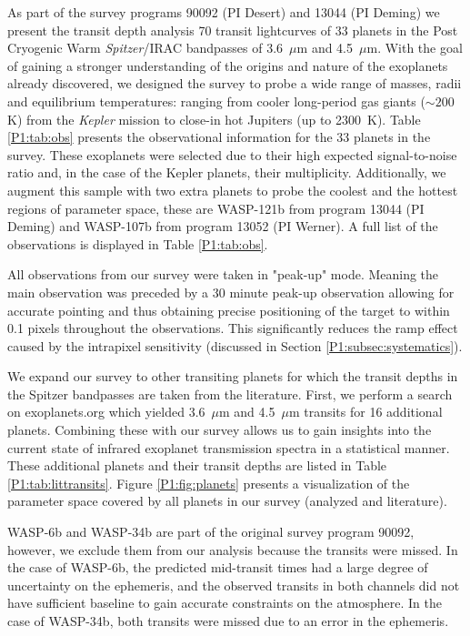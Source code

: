 As part of the survey programs 90092 (PI Desert) and 13044 (PI Deming) we present the transit depth analysis 70 transit lightcurves of 33 planets in the Post Cryogenic Warm \textit{Spitzer}/IRAC bandpasses of 3.6~$\mu$m and 4.5~$\mu$m. With the goal of gaining a stronger understanding of the origins and nature of the exoplanets already discovered, we designed the survey to probe a wide range of masses, radii and equilibrium temperatures: ranging from cooler long-period gas giants ($\sim200$K) from the \textit{Kepler} mission to close-in hot Jupiters (up to 2300~K). Table \ref{P1:tab:obs} presents the observational information for the 33 planets in the survey. These exoplanets were selected due to their high expected signal-to-noise ratio and, in the case of the Kepler planets, their multiplicity. Additionally, we augment this sample with two extra planets to probe the coolest and the hottest regions of parameter space, these are WASP-121b from program 13044 (PI Deming) and WASP-107b from program 13052 (PI Werner). A full list of the observations is displayed in Table \ref{P1:tab:obs}.

All observations from our survey were taken in "peak-up" mode. Meaning the main observation was preceded by a 30 minute peak-up observation allowing for accurate pointing and thus obtaining precise positioning of the target to within 0.1 pixels throughout the observations. This significantly reduces the ramp effect caused by the intrapixel sensitivity (discussed in Section \ref{P1:subsec:systematics}).

We expand our survey to other transiting planets for which the transit depths in the Spitzer bandpasses are taken from the literature. First, we perform a search on exoplanets.org \citep{Wright2011} which yielded 3.6~$\mu$m and 4.5~$\mu$m transits for 16 additional planets. Combining these with our survey allows us to gain insights into the current state of infrared exoplanet transmission spectra in a statistical manner. These additional planets and their transit depths are listed in Table \ref{P1:tab:littransits}. Figure \ref{P1:fig:planets} presents a visualization of the parameter space covered by all planets in our survey (analyzed and literature).

WASP-6b and WASP-34b are part of the original survey program 90092, however, we exclude them from our analysis because the transits were missed. In the case of WASP-6b, the predicted mid-transit times had a large degree of uncertainty on the ephemeris, and the observed transits in both channels did not have sufficient baseline to gain accurate constraints on the atmosphere. In the case of WASP-34b, both transits were missed due to an error in the ephemeris.

